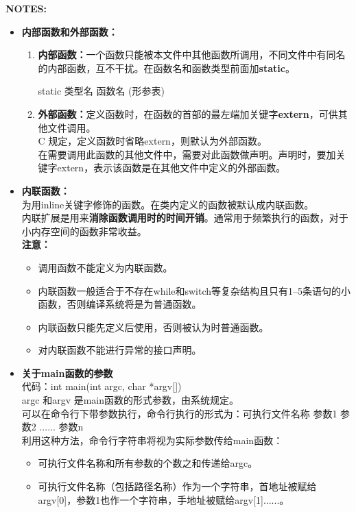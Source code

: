 \documentclass[UTF8]{ctexart}
\begin{document}
	\begin{framed}
		\textbf{NOTES:}\begin{itemize}
			\item \textbf{内部函数和外部函数：}\begin{enumerate}
				\item \textbf{内部函数：}一个函数只能被本文件中其他函数所调用，不同文件中有同名的内部函数，互不干扰。在函数名和函数类型前面加\textbf{static}。\begin{framed}
					static 类型名 函数名 (形参表)
				\end{framed}
				\item \textbf{外部函数：}定义函数时，在函数的首部的最左端加关键字\textbf{extern}，可供其他文件调用。\\C 规定，定义函数时省略extern，则默认为外部函数。\\在需要调用此函数的其他文件中，需要对此函数做声明。声明时，要加关键字extern，表示该函数是在其他文件中定义的外部函数。
			\end{enumerate}
			\item \textbf{内联函数：}\\为用inline关键字修饰的函数。在类内定义的函数被默认成内联函数。\\内联扩展是用来\textbf{消除函数调用时的时间开销}。通常用于频繁执行的函数，对于小内存空间的函数非常收益。\\ \textbf{注意：}\begin{itemize}
				\item 调用函数不能定义为内联函数。
				\item 内联函数一般适合于不存在while和switch等复杂结构且只有1--5条语句的小函数，否则编译系统将是为普通函数。
				\item 内联函数只能先定义后使用，否则被认为时普通函数。
				\item 对内联函数不能进行异常的接口声明。
			\end{itemize}
			\item \textbf{关于main函数的参数}\\代码：int main(int argc, char *argv[])\\argc 和argv 是main函数的形式参数，由系统规定。\\可以在命令行下带参数执行，命令行执行的形式为：可执行文件名称 参数1 参数2 ...... 参数n\\利用这种方法，命令行字符串将视为实际参数传给main函数：\begin{itemize}
				\item 可执行文件名称和所有参数的个数之和传递给argc。
				\item 可执行文件名称（包括路径名称）作为一个字符串，首地址被赋给argv[0]，参数1也作一个字符串，手地址被赋给argv[1]......。

\end{itemize}
\end{itemize}
\end{framed}
\end{document}

